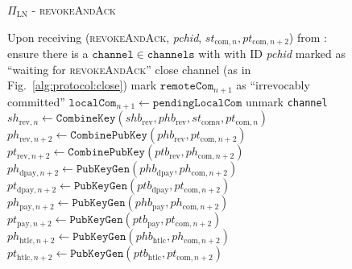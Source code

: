   \begin{figure}[H]
    \begin{protocolbox}{$\Pi_{\mathrm{LN}}$ - \textsc{revokeAndAck}}
      \begin{algorithmic}[1]
        \State Upon receiving (\textsc{revokeAndAck}, \textit{pchid},
        $st_{\mathrm{com}, n}, pt_{\mathrm{com}, n+2}$) from \bob:
        \Indent
          \State ensure there is a $\mathtt{channel} \in \mathtt{channels}$ with
          \bob{} with ID \textit{pchid} marked as ``waiting for
          \textsc{revokeAndAck}''
            \State close channel (as in Fig.~\ref{alg:protocol:close})
            \State \Return
          \EndIf
          \State mark $\mathtt{remoteCom}_{n+1}$ as ``irrevocably committed''
          \State $\mathtt{localCom}_{n+1} \gets \mathtt{pendingLocalCom}$
          \State unmark \texttt{channel}
          \State $sh_{\mathrm{rev}, n} \gets
          \mathtt{CombineKey}\left(shb_{\mathrm{rev}}, phb_{\mathrm{rev}},
          st_{\mathrm{com} n}, pt_{\mathrm{com}, n}\right)$
          \State $ph_{\mathrm{rev}, n+2} \gets
          \mathtt{CombinePubKey}\left(phb_{\mathrm{rev}}, pt_{\mathrm{com},
          n+2}\right)$
          \State $pt_{\mathrm{rev}, n+2} \gets
          \mathtt{CombinePubKey}\left(ptb_{\mathrm{rev}}, ph_{\mathrm{com},
          n+2}\right)$
          \State $ph_{\mathrm{dpay}, n+2} \gets
          \texttt{PubKeyGen}\left(phb_{\mathrm{dpay}}, ph_{\mathrm{com},
          n+2}\right)$
          \State $pt_{\mathrm{dpay}, n+2} \gets
          \texttt{PubKeyGen}\left(ptb_{\mathrm{dpay}}, pt_{\mathrm{com},
          n+2}\right)$
          \State $ph_{\mathrm{pay}, n+2} \gets
          \texttt{PubKeyGen}\left(phb_{\mathrm{pay}}, ph_{\mathrm{com},
          n+2}\right)$
          \State $pt_{\mathrm{pay}, n+2} \gets
          \texttt{PubKeyGen}\left(ptb_{\mathrm{pay}}, pt_{\mathrm{com},
          n+2}\right)$
          \State $ph_{\mathrm{htlc}, n+2} \gets
          \texttt{PubKeyGen}\left(phb_{\mathrm{htlc}}, ph_{\mathrm{com},
          n+2}\right)$
          \State $pt_{\mathrm{htlc}, n+2} \gets
          \texttt{PubKeyGen}\left(ptb_{\mathrm{htlc}}, pt_{\mathrm{com},
          n+2}\right)$
        \EndIndent
      \end{algorithmic}
    \end{protocolbox}
    \caption{}
    \label{alg:protocol:pay:revokeAndAck}
  \end{figure}

